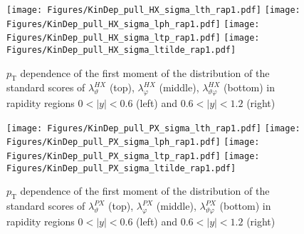 \documentclass[12pt]{article}
\newcommand{\pT}{p_\mathrm{T}}
\newcommand{\absy}{\left |  y \right |}
\newcommand{\lamthHX}{\lambda^{\scriptscriptstyle HX}_\vartheta}
\newcommand{\lamphHX}{\lambda^{\scriptscriptstyle HX}_\varphi}
\newcommand{\lamthphHX}{\lambda^{\scriptscriptstyle HX}_{\vartheta \varphi}}
\newcommand{\lamthPX}{\lambda^{\scriptscriptstyle PX}_\vartheta}
\newcommand{\lamphPX}{\lambda^{\scriptscriptstyle PX}_\varphi}
\newcommand{\lamthphPX}{\lambda^{\scriptscriptstyle PX}_{\vartheta \varphi}}
\begin{document}
\begin{figure}[htbp]
\centering
\texttt{[image: Figures/KinDep\_pull\_HX\_sigma\_lth\_rap1.pdf]}
\texttt{[image: Figures/KinDep\_pull\_HX\_sigma\_lph\_rap1.pdf]}
\texttt{[image: Figures/KinDep\_pull\_HX\_sigma\_ltp\_rap1.pdf]}
\texttt{[image: Figures/KinDep\_pull\_HX\_sigma\_ltilde\_rap1.pdf]}
\caption{$\pT$ dependence of the first moment of the distribution of the
standard scores of $\lamthHX$ (top), $\lamphHX$ (middle), $\lamthphHX$ (bottom)
in rapidity regions $0<\absy<0.6$ (left) and $0.6<\absy<1.2$ (right)}
\end{figure}
\clearpage

\begin{figure}[htbp]
\centering
\texttt{[image: Figures/KinDep\_pull\_PX\_sigma\_lth\_rap1.pdf]}
\texttt{[image: Figures/KinDep\_pull\_PX\_sigma\_lph\_rap1.pdf]}
\texttt{[image: Figures/KinDep\_pull\_PX\_sigma\_ltp\_rap1.pdf]}
\texttt{[image: Figures/KinDep\_pull\_PX\_sigma\_ltilde\_rap1.pdf]}
\caption{$\pT$ dependence of the first moment of the distribution of the
standard scores of $\lamthPX$ (top), $\lamphPX$ (middle), $\lamthphPX$ (bottom)
in rapidity regions $0<\absy<0.6$ (left) and $0.6<\absy<1.2$ (right)}
\end{figure}
\clearpage
\end{document}

